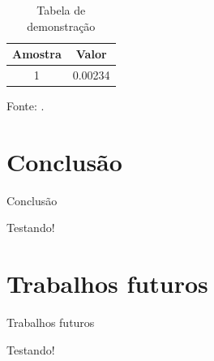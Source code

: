\documentclass[a4paper]{beamer}
\begin{document}
\begin{frame}{}
    \begin{table}[]
        \centering
        \caption{Tabela de demonstração}
        \begin{tabular}{c|c}
            \hline
            \hline
            Amostra & Valor \\
            \hline
            1 & 0.00234 \\
            \hline
            \hline
        \end{tabular}
        \label{tab:Rotulo_da_tabela}
    \end{table}
    \hspace{2.65cm} %
    \tiny{Fonte: \cite{MoreiraTorrezam2020}.}
\end{frame}

\section{Conclusão}
\begin{frame}{Conclusão}
    \par Testando!
\end{frame}

\section{Trabalhos futuros}
\begin{frame}{Trabalhos futuros}
    \par Testando!
\end{frame}
\end{document}
